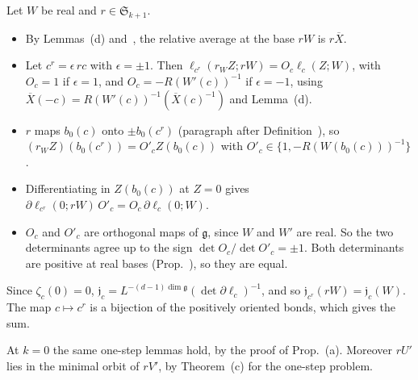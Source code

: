 \begin{detail}
\begin{step}
Let $W$ be real and $r\in\mathfrak S_{k+1}$.
\begin{itemize}
\item By Lemmas~(d) and~, the relative average at the base $rW$ is $r\overline X$.
\item Let $c^r=\epsilon\,rc$ with $\epsilon=\pm1$. Then $\ell_{c^r}(r_WZ;rW)=O_c\ell_c(Z;W)$, with $O_c=1$ if $\epsilon=1$, and $O_c=-R(W'(c))^{-1}$ if $\epsilon=-1$, using $\overline X(-c)=R(W'(c))^{-1}(\overline X(c)^{-1})$ and Lemma~(d).
\item $r$ maps $b_0(c)$ onto $\pm b_0(c^r)$ (paragraph after Definition~), so $(r_WZ)(b_0(c^r))=O'_cZ(b_0(c))$ with $O'_c\in\{1,-R(W(b_0(c)))^{-1}\}$.
\item Differentiating in $Z(b_0(c))$ at $Z=0$ gives $\partial\ell_{c^r}(0;rW)\,O'_c=O_c\,\partial\ell_c(0;W)$.
\item $O_c$ and $O'_c$ are orthogonal maps of $\mathfrak g$, since $W$ and $W'$ are real. So the two determinants agree up to the sign $\det O_c/\det O'_c=\pm1$. Both determinants are positive at real bases (Prop.~), so they are equal.
\end{itemize}
Since $\zeta_c(0)=0$, $\mathfrak j_c=L^{-(d-1)\dim\mathfrak g}(\det\partial\ell_c)^{-1}$, and so $\mathfrak j_{c^r}(rW)=\mathfrak j_c(W)$. The map $c\mapsto c^r$ is a bijection of the positively oriented bonds, which gives the sum.

At $k=0$ the same one-step lemmas hold, by the proof of Prop.~(a). Moreover $rU'$ lies in the minimal orbit of $rV'$, by Theorem~(c) for the one-step problem.
\end{step}
\end{detail}

